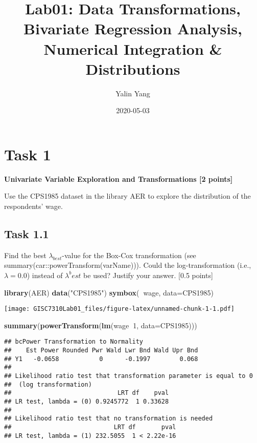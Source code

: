 \documentclass[
]{article}
\title{Lab01: Data Transformations, Bivariate Regression Analysis, Numerical
Integration \& Distributions}
\author{Yalin Yang}
\date{2020-05-03}
\newenvironment{Shaded}{\begin{snugshade}}{\end{snugshade}}
\newcommand{\DataTypeTok}[1]{\textcolor[rgb]{0.13,0.29,0.53}{#1}}
\newcommand{\DecValTok}[1]{\textcolor[rgb]{0.00,0.00,0.81}{#1}}
\newcommand{\KeywordTok}[1]{\textcolor[rgb]{0.13,0.29,0.53}{\textbf{#1}}}
\newcommand{\NormalTok}[1]{#1}
\newcommand{\OperatorTok}[1]{\textcolor[rgb]{0.81,0.36,0.00}{\textbf{#1}}}
\newcommand{\StringTok}[1]{\textcolor[rgb]{0.31,0.60,0.02}{#1}}
\begin{document}
\maketitle

{
\setcounter{tocdepth}{3}
\tableofcontents
}
\hypertarget{task-1}{%
\section{Task 1}\label{task-1}}

\textbf{Univariate Variable Exploration and Transformations {[}2
points{]}}

Use the CPS1985 dataset in the library AER to explore the distribution
of the respondents' wage.

\hypertarget{task-1.1}{%
\subsection{Task 1.1}\label{task-1.1}}

Find the best \(\lambda_{best}\)-value for the Box-Cox transformation
(see summary(car::powerTransform(varName))). Could the
log-transformation (i.e., \(\lambda=0.0\)) instead of \(\lambda^best\)
be used? Justify your answer. {[}0.5 points{]}

\begin{Shaded}
\begin{Highlighting}[]
\KeywordTok{library}\NormalTok{(AER)}
\KeywordTok{data}\NormalTok{(}\StringTok{"CPS1985"}\NormalTok{)}
\KeywordTok{symbox}\NormalTok{(}\OperatorTok{~}\NormalTok{wage, }\DataTypeTok{data=}\NormalTok{CPS1985)}
\end{Highlighting}
\end{Shaded}

\texttt{[image: GISC7310Lab01\_files/figure-latex/unnamed-chunk-1-1.pdf]}

\begin{Shaded}
\begin{Highlighting}[]
\KeywordTok{summary}\NormalTok{(}\KeywordTok{powerTransform}\NormalTok{(}\KeywordTok{lm}\NormalTok{(wage}\OperatorTok{~}\DecValTok{1}\NormalTok{, }\DataTypeTok{data=}\NormalTok{CPS1985)))}
\end{Highlighting}
\end{Shaded}

\begin{verbatim}
## bcPower Transformation to Normality 
##    Est Power Rounded Pwr Wald Lwr Bnd Wald Upr Bnd
## Y1   -0.0658           0      -0.1997        0.068
## 
## Likelihood ratio test that transformation parameter is equal to 0
##  (log transformation)
##                             LRT df    pval
## LR test, lambda = (0) 0.9245772  1 0.33628
## 
## Likelihood ratio test that no transformation is needed
##                            LRT df       pval
## LR test, lambda = (1) 232.5055  1 < 2.22e-16
\end{verbatim}
\end{document}
